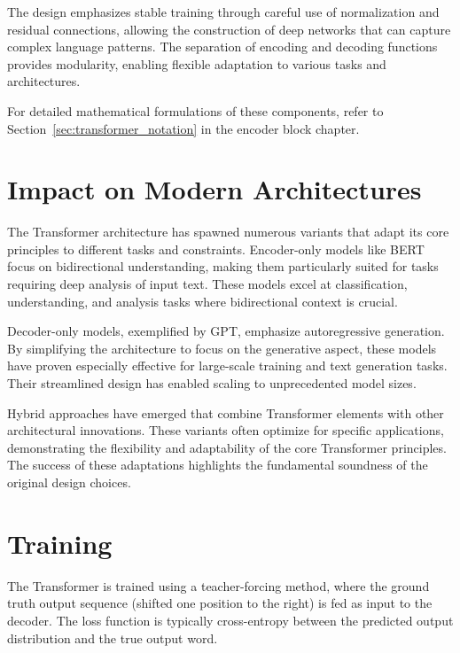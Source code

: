 The design emphasizes stable training through careful use of normalization and residual connections, allowing the construction of deep networks that can capture complex language patterns. The separation of encoding and decoding functions provides modularity, enabling flexible adaptation to various tasks and architectures.

For detailed mathematical formulations of these components, refer to Section~\ref{sec:transformer_notation} in the encoder block chapter.

\section{Impact on Modern Architectures}
\noindent
The Transformer architecture has spawned numerous variants that adapt its core principles to different tasks and constraints. Encoder-only models like BERT focus on bidirectional understanding, making them particularly suited for tasks requiring deep analysis of input text. These models excel at classification, understanding, and analysis tasks where bidirectional context is crucial.

Decoder-only models, exemplified by GPT, emphasize autoregressive generation. By simplifying the architecture to focus on the generative aspect, these models have proven especially effective for large-scale training and text generation tasks. Their streamlined design has enabled scaling to unprecedented model sizes.

Hybrid approaches have emerged that combine Transformer elements with other architectural innovations. These variants often optimize for specific applications, demonstrating the flexibility and adaptability of the core Transformer principles. The success of these adaptations highlights the fundamental soundness of the original design choices.

\section{Training}
The Transformer is trained using a teacher-forcing method, where the ground truth output sequence (shifted one position to the right) is fed as input to the decoder. The loss function is typically cross-entropy between the predicted output distribution and the true output word.

